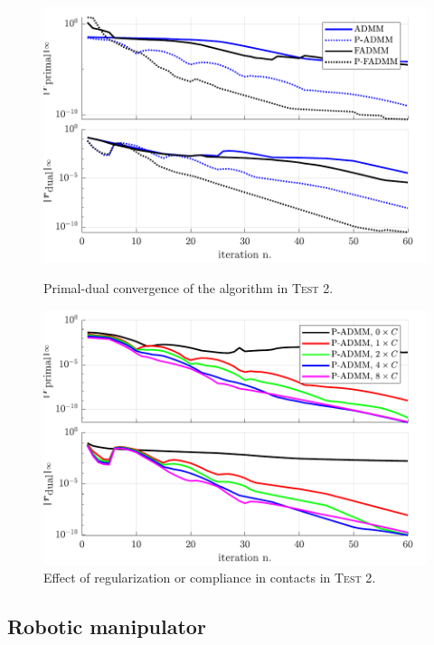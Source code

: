 \documentclass[final,3p]{elsarticle}
\begin{document}
\begin{figure}[!tbp]
  \centering
  \begin{minipage}[t]{0.48\textwidth}
    \includegraphics[width=\textwidth]{pics/t8_primdual.pdf}
    \caption{Primal-dual convergence of the algorithm in \textsc{Test 2}.}
		\label{fig:t8_primdual}
  \end{minipage}
  \hfill
	\begin{minipage}[t]{0.48\textwidth}
    \includegraphics[width=\textwidth]{pics/t8_compliance.pdf}
    \caption{Effect of regularization or compliance in contacts in \textsc{Test 2}.}
  \end{minipage}
\end{figure}


\subsection{Robotic manipulator}
\end{document}
